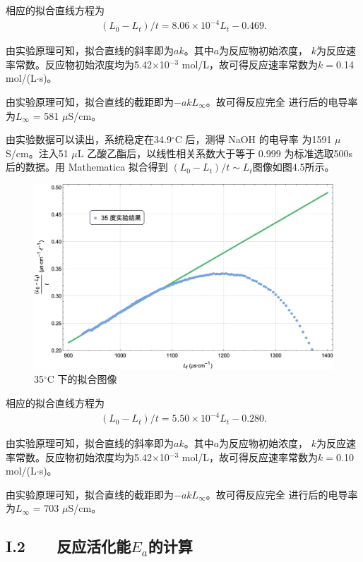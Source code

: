 \documentclass[12pt]{ctexart}
\numberwithin{equation}{section}
\begin{document}
相应的拟合直线方程为
\begin{align}
    (L_0 - L_t)/t = 8.06 \times 10^{-4} L_t - 0.469.
    \tag{I.1}
\end{align}

由实验原理可知，拟合直线的斜率即为$ak$。其中$a$为反应物初始浓度，
$k$为反应速率常数。反应物初始浓度均为5.42$\times$10$^{-3}$
mol/L，故可得反应速率常数为$k = $0.14 mol/(L$\cdot$s)。

由实验原理可知，拟合直线的截距即为$-akL_\infty$。故可得反应完全
进行后的电导率为$L_\infty$ = 581 $\mu$S/cm。

由实验数据可以读出，系统稳定在34.9$^\circ$C 后，测得 NaOH 的电导率
为1591 $\mu$S/cm。注入51 $\mu$L 乙酸乙酯后，以线性相关系数大于等于 $0.999$ 为标准选取500s后的数据。用 Mathematica 拟合得到
$(L_0 - L_t)/t \sim L_t$图像如图4.5所示。
\begin{figure}[!h]
    \centering
    \includegraphics[scale=0.45]{35degree.jpg}
    \caption{35$^\circ$C 下的拟合图像}
\end{figure}

相应的拟合直线方程为
\begin{align}
    (L_0 - L_t)/t = 5.50 \times 10^{-4} L_t - 0.280.
    \tag{I.2}
\end{align}

由实验原理可知，拟合直线的斜率即为$ak$。其中$a$为反应物初始浓度，
$k$为反应速率常数。反应物初始浓度均为5.42$\times$10$^{-3}$
mol/L，故可得反应速率常数为$k = $0.10 mol/(L$\cdot$s)。

由实验原理可知，拟合直线的截距即为$-akL_\infty$。故可得反应完全
进行后的电导率为$L_\infty$ = 703 $\mu$S/cm。

\subsection*{I.2~~~ 反应活化能$E_a$的计算}
\end{document}
